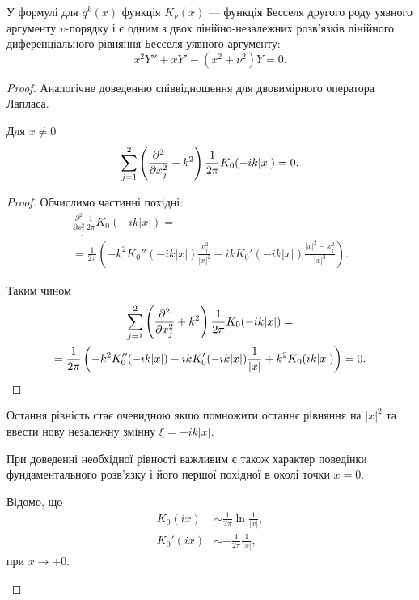 \begin{remark}
	У формулі для $q^k(x)$ функція $K_\nu(x)$ --- функція Бесселя другого роду уявного аргументу $v$-порядку і є одним з двох лінійно-незалежних розв'язків лінійного диференціального рівняння Бесселя уявного аргументу:
	\begin{equation}
		x^2 Y'' + x Y' - (x^2 + \nu^2) Y = 0.
	\end{equation}
\end{remark}

\begin{proof}
	Аналогічне доведенню співвідношення для двовимірного оператора Лапласа.

	\begin{proposition} 
		Для $x \ne 0$
		\begin{equation}
			\displaystyle\sum\limits_{j = 1}^2 \left(\frac{\partial^2}{\partial x_j^2} + k^2\right) \frac{1}{2\pi} K_0(-ik|x|) = 0.
		\end{equation}
	\end{proposition}
 
 	\begin{proof}
		Обчислимо частинні похідні:
		\begin{multline}
			\frac{\partial^2}{\partial x_j^2}\frac{1}{2\pi}K_0(-ik|x|) = \\
			= \frac{1}{2\pi}\left(-k^2K_0''(-ik|x|)\frac{x_j^2}{|x|^2}-ikK_0'(-ik|x|)\frac{|x|^2-x_j^2}{|x|^3}\right).
		\end{multline}

		Таким чином
		\begin{multline}
			\displaystyle\sum\limits_{j=1}^2\left(\frac{\partial^2}{\partial x_j^2}+k^2\right)\frac{1}{2\pi}K_0(-ik|x|) = \\
			= \frac{1}{2\pi}\left(-k^2K_0''(-ik|x|)-ikK_0'(-ik|x|)\frac{1}{|x|}+k^2K_0(ik|x|)\right)=0.
		\end{multline}
	\end{proof}

	\begin{remark}
		Остання рівність стає очевидною якщо помножити останнє рівняння на $|x|^2$ та ввести нову незалежну змінну $\xi = - i k |x|$.
	\end{remark}

	\begin{remark}
		При доведенні необхідної рівності важливим є також характер поведінки фундаментального розв'язку і його першої похідної в околі точки $x = 0$. \medskip

		Відомо, що
		\begin{align}
			K_0(ix) &\sim \frac{1}{2\pi} \ln\frac{1}{|x|}, \\
			K_0'(ix) &\sim -\frac{1}{2\pi} \frac{1}{|x|},
		\end{align}
		при $x\to+0$.
	\end{remark}
\end{proof}

